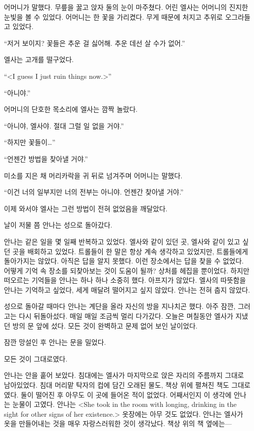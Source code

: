 어머니가 말했다. 무릎을 꿇고 앉자 둘의 눈이 마주쳤다. 어린 엘사는 어머니의 진지한 눈빛을 볼 수 있었다. 어머니는 한 꽃을 가리켰다. 무게 때문에 처지고 추위로 오그라들고 있었다.

``저거 보이지? 꽃들은 추운 걸 싫어해. 추운 데선 살 수가 없어.''

엘사는 고개를 떨구었다.

``<I guess I just ruin things now.>''

``아니야.''

어머니의 단호한 목소리에 엘사는 깜짝 놀랐다.

``아니야, 엘사야. 절대 그럴 일 없을 거야.''

``하지만 꽃들이\ldots''

``언젠간 방법을 찾아낼 거야.''

미소를 지은 채 머리카락을 귀 뒤로 넘겨주며 어머니는 말했다.

``이건 너의 일부지만 너의 전부는 아니야. 언젠간 찾아낼 거야.''

이제 와서야 엘사는 그런 방법이 전혀 없었음을 깨달았다.

\textbreak

날이 저물 쯤 안나는 성으로 돌아갔다.

안나는 같은 일을 몇 일째 반복하고 있었다. 엘사와 같이 있던 곳, 엘사와 같이 있고 싶던 곳을 배회하고 있었다. 트롤들이 한 말은 항상 계속 생각하고 있었지만, 트롤들에게 돌아가지는 않았다. 아직은 답을 알지 못했다. 이런 장소에서는 답을 찾을 수 없었다. 어떻게 기억 속 장소를 되찾아보는 것이 도움이 될까? 상처를 헤집을 뿐이었다. 하지만 떠오르는 기억들을 안나는 하나 하나 소중히 했다. 아프지가 않았다. 엘사의 따뜻함을 안나는 기억하고 싶었다, 세게 매달려 떨어지고 싶지 않았다. 안나는 전혀 춥지 않았다.

성으로 돌아갈 때마다 안나는 계단을 올라 자신의 방을 지나치곤 했다. 아주 잠깐, 그러고는 다시 뒤돌아섰다. 매일 매일 조금씩 멀리 다가갔다. 오늘은 며칠동안 엘사가 지냈던 방의 문 앞에 섰다. 모든 것이 완벽하고 문제 없어 보인 날이었다.

잠깐 망설인 후 안나는 문을 밀었다.


모든 것이 그대로였다.

안나는 안을 훝어 보았다. 침대에는 엘사가 마지막으로 앉은 자리의 주름까지 그대로 남아있었다. 침대 머리맡 탁자의 컵에 담긴 오래된 물도, 책상 위에 펼쳐진 책도 그대로였다. 둘이 떨어진 후 아무도 이 곳에 들어온 적이 없었다. 어째서인지 이 생각에 안나는 눈물이 고였다. 안나는 <She took in the room with longing, drinking in the sight for other signs of her existence.> 옷장에는 아무 것도 없었다. 안나는 엘사가 옷을 만들어내는 것을 매우 자랑스러워한 것이 생각났다. 책상 위의 책 옆에는—

